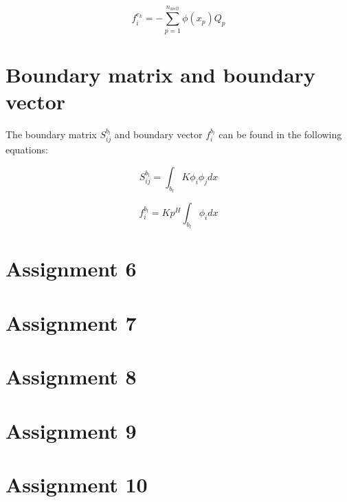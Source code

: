 \documentclass{report}
\begin{document}
\begin{equation}
	f^{e_k}_i =  -\sum_{p=1}^{n_{well}}\phi(x_p) Q_p
\end{equation}


\section{Boundary matrix and boundary vector}

The boundary matrix $S^{b_l}_{ij}$ and boundary vector $f^{b_l}_i$ can be found in the following equations:

\begin{equation}
	S^{b_l}_{ij} = \int_{b_l} K\phi_i \phi_j dx
\end{equation}

\begin{equation}
	f^{b_l}_i = Kp^H\int_{b_l}\phi_i dx
\end{equation}


\section{Assignment 6}



\section{Assignment 7}



\section{Assignment 8}



\section{Assignment 9}



\section{Assignment 10}
\end{document}
